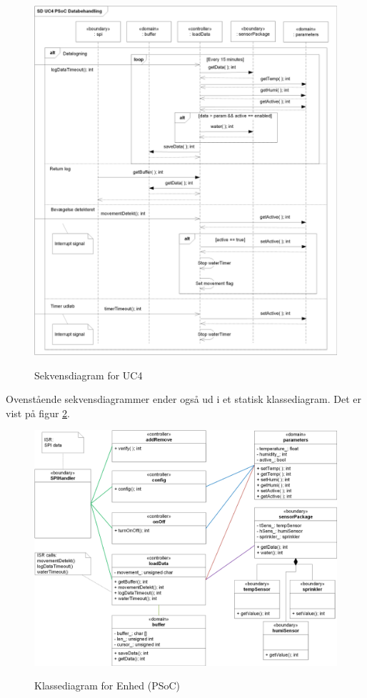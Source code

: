\begin{figure}[htbp] \centering
{\includegraphics[scale=0.8]{filer/design/a_psoc_uc4}}
\caption{Sekvensdiagram for UC4}
\label{fig:psoc_sd_uc4}
\end{figure} 

\clearpage
Ovenstående sekvensdiagrammer ender også ud i et statisk klassediagram. Det er vist på figur \ref{fig:psoc_klassediagram}.

\begin{figure}[htbp] \centering
{\includegraphics[width=\textwidth]{filer/design/sw_class_psoc}}
\caption{Klassediagram for Enhed (PSoC)}
\label{fig:psoc_klassediagram}
\end{figure} 